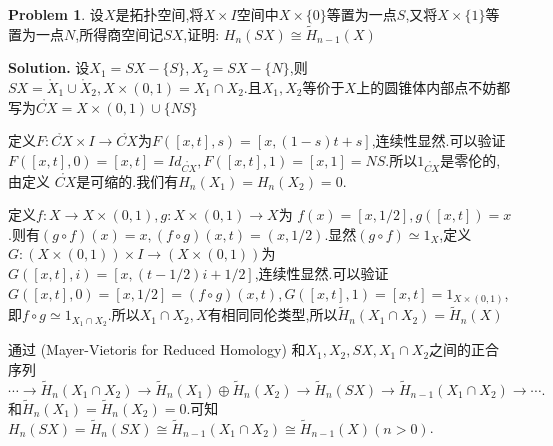 \documentclass[a4paper]{book}
\newenvironment{solution}%
{\noindent\textbf{Solution.}}%
{\qedhere}
\numberwithin{equation}{chapter}
\theoremstyle{definition}
\newtheorem{pro}[exm]{Problem}
\begin{document}
\begin{pro}
  设$X$是拓扑空间,将$X \times I$空间中$X \times \{0\}$等置为一点$S$,又将$X \times \{1\}$等置为一点$N$,所得商空间记$SX$,证明: $H_n(SX) \cong \tilde{H}_{n-1}(X)$
\end{pro}


\begin{solution}
  设$X_1 = SX - \{S\}, X_2 = SX - \{N\}$,则$SX = \mathring{X}_1 \cup \mathring{X}_2, X \times (0,1) = X_1 \cap X_2$.且$X_1,X_2$等价于$X$上的圆锥体内部点不妨都写为$\mathring{CX} = X \times (0,1) \cup \{NS\}$

  定义$F \colon \mathring{CX} \times I \rightarrow  \mathring{CX}$为$F([x,t],s) = [x,(1 -s)t +s]$,连续性显然.可以验证$F([x,t],0) = [x,t] = Id_{\mathring{CX}}, F([x,t],1) = [x,1] = NS$.所以$1_{\mathring{CX}}$是零伦的,由定义 $\mathring{CX}$是可缩的.我们有$H_n(X_1) = H_n(X_2) = 0$.

  定义$f \colon X \rightarrow X \times (0,1), g \colon X \times (0,1) \rightarrow X$为 $f(x) = [x,1/2], g([x,t]) = x$.则有$ (g \circ f)(x) = x, (f \circ g)(x,t) = (x,1/2)$.显然$(g \circ f) \simeq 1_X$,定义 $G \colon (X \times (0,1)) \times I \rightarrow (X \times (0,1))$为 $G([x,t],i) = [x,(t - 1/2)i + 1/2]$,连续性显然.可以验证$G([x,t],0) = [x,1/2] = (f \circ g)(x,t), G([x,t],1) = [x,t] = 1_{X \times (0,1)}$,即$f \circ g \simeq 1_{X_1 \cap X_2}$.所以$X_1 \cap X_2,X$有相同同伦类型,所以$\tilde{H}_n(X_1 \cap X_2) = \tilde{H}_n(X)$

  通过 (Mayer-Vietoris for Reduced Homology) 和$X_1,X_2,SX, X_1 \cap X_2$之间的正合序列
  \[ \cdots \rightarrow \tilde{H}_n(X_1 \cap X_2) \rightarrow \tilde{H}_n(X_1) \oplus \tilde{H}_n(X_2)\rightarrow \tilde{H}_n (SX) \rightarrow \tilde{H}_{n-1}(X_1 \cap X_2) \rightarrow \cdots.\]
  和$\tilde{H}_n(X_1) = \tilde{H}_n(X_2) = 0$.可知$H_n(SX) = \tilde{H}_n(SX) \cong \tilde{H}_{n-1}(X_1 \cap X_2) \cong \tilde{H}_{n-1}(X) (n>0)$.
\end{solution}

%   

%   

%   


\end{document}
